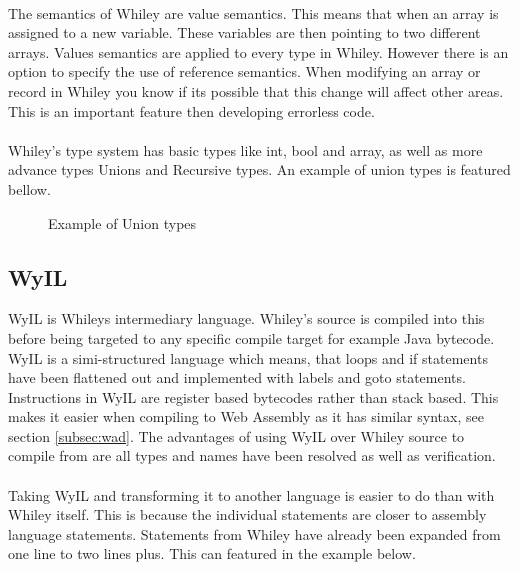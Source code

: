 \paragraph{}
The semantics of Whiley are value semantics. This means that when an array is assigned to a new variable. These variables are then pointing to two different arrays. Values semantics are applied to every type in Whiley. However there is an option to specify the use of reference semantics. When modifying an array or record in Whiley you know if its possible that this change will affect other areas. This is an important feature then developing errorless code.%

\paragraph{}
Whiley's type system has basic types like int, bool and array, as well as more advance types Unions and Recursive types. An example of union types is featured bellow.
\begin{figure}[H]
  \centering
  
  \caption{Example of Union types}
  \label{fig:whiley}
\end{figure}


\subsection{WyIL}

WyIL is Whileys intermediary language. Whiley's source is compiled into this before being targeted to any specific compile target for example Java bytecode. WyIL is a simi-structured language \cite{1_pearce_2016} which means, that loops and if statements have been flattened out and implemented with labels and goto statements. Instructions in WyIL are register based bytecodes \cite{1_pearce_2016} rather than stack based. This makes it easier when compiling to Web Assembly as it has similar syntax, see section \ref{subsec:wad}. The advantages of using WyIL over Whiley source to compile from are all types and names have been resolved \cite{1_pearce_2016} as well as verification.

\paragraph{}
Taking WyIL and transforming it to another language is easier to do than with Whiley itself. This is because the individual statements are closer to assembly language statements. Statements from Whiley have already been expanded from one line to two lines plus. This can featured in the example below.  

